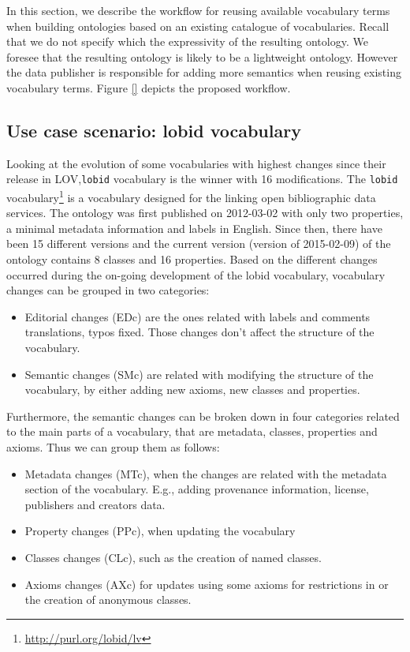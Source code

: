 
In this section, we describe the workflow for reusing available vocabulary terms when building ontologies based on an existing catalogue of vocabularies. Recall that we do not specify which the expressivity of the resulting ontology. We foresee that the resulting ontology is likely to be a lightweight ontology. However the data publisher is responsible for adding more semantics when reusing existing vocabulary terms. Figure \ref{} depicts the proposed workflow. 

\subsection{Use case scenario: lobid vocabulary}
\label{lobid vocabulary}
Looking at the evolution of some vocabularies with highest changes since their release in LOV,\texttt{lobid} vocabulary is the winner with 16 modifications. The \texttt{lobid} vocabulary\footnote{\url{http://purl.org/lobid/lv}} is a vocabulary designed for the  linking open bibliographic data services. The ontology was first published on 2012-03-02 with only two properties, a minimal metadata information and labels in English. Since then, there have been 15 different versions and the current version (version of 2015-02-09) of the ontology contains 8 classes and 16 properties. Based on the different changes occurred during the on-going development of the lobid vocabulary, vocabulary changes can be grouped in two categories:
\begin{itemize}
\item Editorial changes (EDc) are the ones related with labels and comments translations, typos fixed. Those changes don't affect the structure of the vocabulary.
\item Semantic changes (SMc) are related with modifying the structure of the vocabulary, by either adding new axioms, new classes and properties.
\end{itemize}

Furthermore, the semantic changes can be broken down in four categories related to the main parts of a vocabulary, that are metadata, classes, properties and axioms. Thus we can group them as follows:

\begin{itemize}
\item Metadata changes (MTc), when the changes are related with the metadata section of the vocabulary. E.g., adding provenance information, license, publishers and creators data.
\item Property changes (PPc), when updating the vocabulary 
\item Classes changes (CLc), such as the creation of named classes.
\item Axioms changes (AXc) for updates using some axioms for restrictions in or the creation of anonymous classes. 

\end{itemize}

